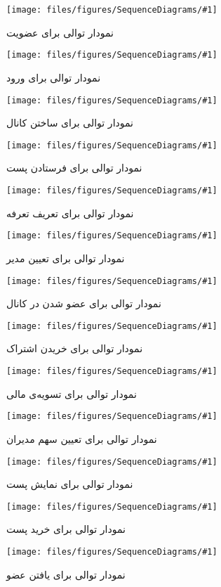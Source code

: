 \newcommand{\secuencediagram}[3]{
    \begin{figure}[H]
        \centering
        \texttt{[image: files/figures/SequenceDiagrams/\#1]}
        \caption{نمودار توالی برای #2}
        \label{fig:#3_seq}
    \end{figure}
}

\secuencediagram{1_sign_up.jpg}{عضویت}{sign_up}
\secuencediagram{2_login.jpg}{ورود}{login}
\secuencediagram{3_channel_create.jpg}{ساختن کانال}{channel_create}
\secuencediagram{4_post_create.jpg}{فرستادن پست}{post_create}
\secuencediagram{5_plan_define.jpg}{تعریف تعرفه}{plan_define}
\secuencediagram{6_admin_set.jpg}{تعیین مدیر}{admin_set}
\secuencediagram{7_channel_join.jpg}{عضو شدن در کانال}{channel_join}
\secuencediagram{8_subscription_buy.jpg}{خریدن اشتراک}{subscription_buy}
\secuencediagram{9_checkout.jpg}{تسویه‌ی مالی}{checkout}
\secuencediagram{10_share_set.jpg}{تعیین سهم مدیران}{share_set}
\secuencediagram{11_post_view.jpg}{نمایش پست}{post_view}
\secuencediagram{12_post_purchase.jpg}{خرید پست}{post_purchase}
\secuencediagram{14_find_member.jpg}{یافتن عضو}{find_member}
